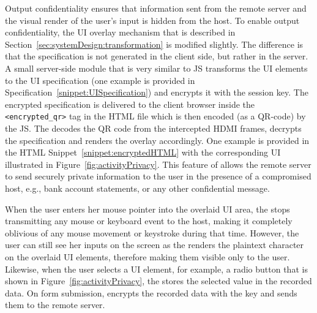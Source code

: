  Output confidentiality ensures that information sent from the remote server and the visual render of the user's input is hidden from the host. To enable output confidentiality, the UI overlay mechanism that is described in Section~\ref{sec:systemDesign:transformation} is modified slightly. The difference is that the specification is not generated in the client side, but rather in the server.
A small server-side module that is very similar to \name JS transforms the UI elements to the UI specification (one example is provided in Specification~\ref{snippet:UISpecification}) and encrypts it with the \tls session key. 
The encrypted specification is delivered to the client browser inside the \texttt{<encrypted\_qr>} tag in the HTML file which is then encoded (as a QR-code) by the \name JS. The \device decodes the QR code from the intercepted HDMI frames, decrypts the specification and renders the overlay accordingly. One example is provided in the HTML Snippet~\ref{snippet:encryptedHTML} with the corresponding UI illustrated in Figure~\ref{fig:activityPrivacy}. 
This feature of \name allows the remote server to send securely private information to the user in the presence of a compromised host, e.g., bank account statements, or any other confidential message. 

 When the user enters her mouse pointer into the overlaid UI area, the \device stops transmitting any mouse or keyboard event to the host, making it completely oblivious of any mouse movement or keystroke during that time. 
However, the user can still see her inputs on the screen as the \device renders the plaintext character on the overlaid UI elements, therefore making them visible only to the user.
Likewise, when the user selects a UI element, for example, a radio button that is shown in Figure~\ref{fig:activityPrivacy}, the \device stores the selected value in the recorded data.
On form submission, \device encrypts the recorded data with the \tls key and sends them to the remote server.

